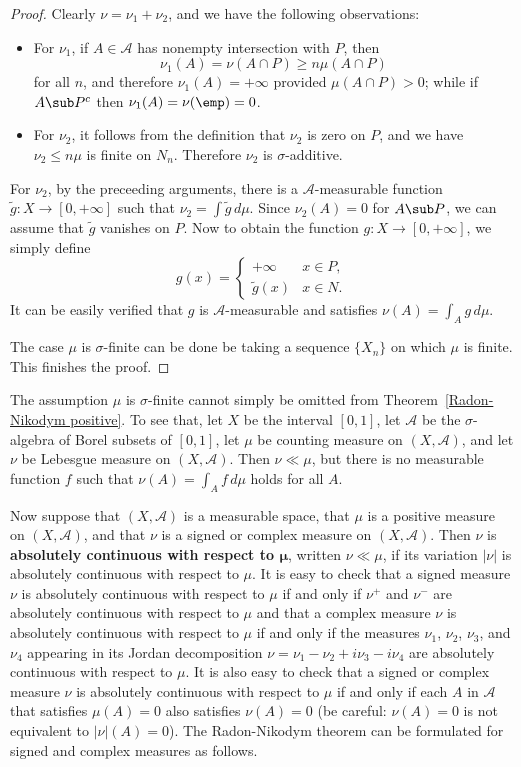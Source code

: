\begin{proof}
Clearly $\nu=\nu_1+\nu_2$, and we have the following observations:
\begin{itemize}
\item For $\nu_1$, if $A\in\mathcal{A}$ has nonempty intersection with $P$, then 
\[\nu_1(A)=\nu(A\cap P)\geq n\mu(A\cap P)\]
for all $n$, and therefore $\nu_1(A)=+\infty$ provided $\mu(A\cap P)>0$; while if $A\sub P^c$ then $\nu_1(A)=\nu(\emp)=0$.
\item For $\nu_2$, it follows from the definition that $\nu_2$ is zero on $P$, and we have $\nu_2\leq n\mu$ is finite on $N_n$. Therefore $\nu_2$ is $\sigma$-additive.
\end{itemize}
For $\nu_2$, by the preceeding arguments, there is a $\mathcal{A}$-measurable function $\widetilde{g}:X\to[0,+\infty]$ such that $\nu_2=\int\widetilde{g}\,d\mu$. Since $\nu_2(A)=0$ for $A\sub P$, we can assume that $\widetilde{g}$ vanishes on $P$. Now to obtain the function $g:X\to[0,+\infty]$, we simply define
\[g(x)=\begin{cases}
+\infty&x\in P,\\
\widetilde{g}(x)&x\in N.
\end{cases}\]
It can be easily verified that $g$ is $\mathcal{A}$-measurable and satisfies $\nu(A)=\int_Ag\,d\mu$.\par
The case $\mu$ is $\sigma$-finite can be done be taking a sequence $\{X_n\}$ on which $\mu$ is finite. This finishes the proof.
\end{proof}
\begin{remark}
The assumption $\mu$ is $\sigma$-finite cannot simply be omitted from Theorem~\ref{Radon-Nikodym positive}. To see that, let $X$ be the interval $[0,1]$, let $\mathcal{A}$ be the $\sigma$-algebra of Borel subsets of $[0,1]$, let $\mu$ be counting measure on $(X,\mathcal{A})$, and let $\nu$ be Lebesgue measure on $(X,\mathcal{A})$. Then $\nu\ll\mu$, but there is no measurable function $f$ such that $\nu(A)=\int_Af\,d\mu$ holds for all $A$.\end{remark}
Now suppose that $(X,\mathcal{A})$ is a measurable space, that $\mu$ is a positive measure on $(X,\mathcal{A})$, and that $\nu$ is a signed or complex measure on $(X,\mathcal{A})$. Then $\nu$ is \textbf{absolutely continuous with respect to $\bm{\mu}$}, written $\nu\ll\mu$, if its variation $|\nu|$ is absolutely continuous with respect to $\mu$. It is easy to check that a signed measure $\nu$ is absolutely continuous with respect to $\mu$ if and only if $\nu^+$ and $\nu^-$ are absolutely continuous with respect to $\mu$ and that a complex measure $\nu$ is absolutely continuous with respect to $\mu$ if and only if the measures $\nu_1$, $\nu_2$, $\nu_3$, and $\nu_4$ appearing in its Jordan decomposition $\nu=\nu_1-\nu_2+i\nu_3-i\nu_4$ are absolutely continuous with respect to $\mu$. It is also easy to check that a signed or complex measure $\nu$ is absolutely continuous with respect to $\mu$ if and only if each $A$ in $\mathcal{A}$ that satisfies $\mu(A)=0$ also satisfies $\nu(A)=0$ (be careful: $\nu(A)=0$ is not equivalent to $|\nu|(A)=0$). The Radon-Nikodym theorem can be formulated for signed and complex measures as follows.
